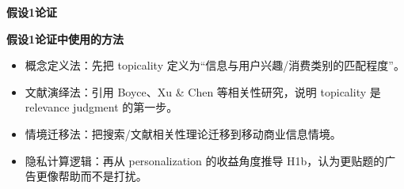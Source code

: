 \documentclass[aspectratio=169,UTF8,zihao=-4]{ctexbeamer}
\newcommand{\bigidea}[1]{
  \begin{center}
    \vspace{0.8em}
    {\LARGE \bfseries #1}
    \vspace{0.6em}
  \end{center}
}
\newcommand{\sectionpageframe}[1]{
  \begin{frame}[plain]
    \begin{center}
      \vfill
      {\Huge \bfseries #1}
      \vfill
    \end{center}
  \end{frame}
}
\begin{document}
\sectionpageframe{假设1论证}

\begin{frame}
  \bigidea{假设1论证中使用的方法}
  \begin{itemize}
    \item \Large 概念定义法：先把 topicality 定义为“信息与用户兴趣/消费类别的匹配程度”。
    \item \Large 文献演绎法：引用 Boyce、Xu \& Chen 等相关性研究，说明 topicality 是 relevance judgment 的第一步。
    \item \Large 情境迁移法：把搜索/文献相关性理论迁移到移动商业信息情境。
    \item \Large 隐私计算逻辑：再从 personalization 的收益角度推导 H1b，认为更贴题的广告更像帮助而不是打扰。
  \end{itemize}
\end{frame}
\end{document}
